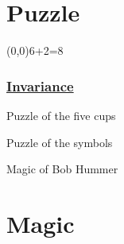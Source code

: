 \section{Puzzle}
\begin{frame}\begin{textblock}{1}(0,0)6+2=8\end{textblock}\frametitle{{\color{red}\underline{\Large\bf
}}}\frametitle{\underline{\Large\bf
Invariance}}

\pause

\centerline{\huge Puzzle of the five cups}

\pause


\vspace{1cm }



\centerline{\huge Puzzle of the symbols}

\pause


\vspace{1cm }



\centerline{\huge Magic of Bob Hummer}
\end{frame}

\section{Magic}


